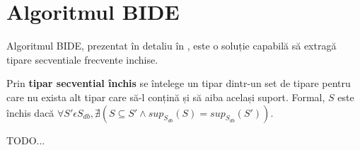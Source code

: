 \section{Algoritmul BIDE}
Algoritmul BIDE, prezentat în detaliu în \cite{bib:wang2004bide}, este o soluție capabilă să extragă tipare secventiale frecvente inchise.

\begin{defi}
Prin \textbf{tipar secvential închis} se întelege un tipar dintr-un set de tipare pentru care nu exista alt tipar care să-l conțină și să aiba același suport. Formal, $S$ este închis dacă $\forall S' \epsilon S_{db}, \nexists (S \subseteq S' \wedge sup_{S_{db}}(S)=sup_{S_{db}}(S'))$.
\end{defi}  

TODO... 